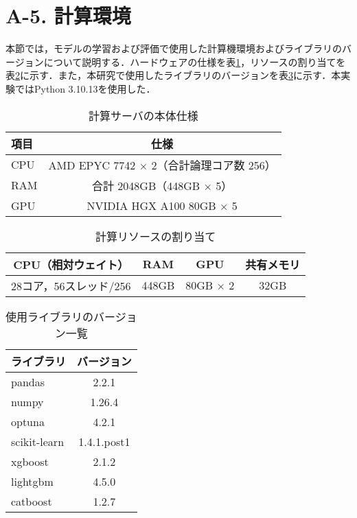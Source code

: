 \section*{A-5. 計算環境}
本節では，モデルの学習および評価で使用した計算機環境およびライブラリのバージョンについて説明する．ハードウェアの仕様を表\ref{tab:server_specs}，リソースの割り当てを表\ref{tab:resource_allocation}に示す．また，本研究で使用したライブラリのバージョンを表\ref{tab:versions}に示す．本実験ではPython 3.10.13を使用した．
\begin{table}[htbp]
    \centering
    \caption{計算サーバの本体仕様}
    \label{tab:server_specs}
    \begin{tabular}{l|c}
        \hline\hline\hline
        項目 & 仕様 \\
        \hline
        CPU  & AMD EPYC 7742 × 2（合計論理コア数 256） \\
        RAM  & 合計 2048GB（448GB × 5） \\
        GPU  & NVIDIA HGX A100 80GB × 5 \\
        \hline\hline\hline
    \end{tabular}
\end{table}

\begin{table}[htbp]
    \centering
    \caption{計算リソースの割り当て}
    \label{tab:resource_allocation}
    \begin{tabular}{c|c|c|c}
        \hline\hline\hline
        CPU（相対ウェイト） & RAM & GPU & 共有メモリ \\
        \hline
        28コア，56スレッド/256 & 448GB & 80GB × 2 & 32GB  \\
        \hline\hline\hline
    \end{tabular}
\end{table}

\begin{table}[htbp]
    \centering
    \caption{使用ライブラリのバージョン一覧}
    \label{tab:versions}
    \begin{tabular}{l|c}
        \hline\hline\hline
        ライブラリ & バージョン \\
        \hline
        pandas & 2.2.1 \\
        numpy & 1.26.4 \\
        optuna & 4.2.1 \\
        scikit-learn & 1.4.1.post1 \\
        xgboost & 2.1.2 \\
        lightgbm & 4.5.0 \\
        catboost & 1.2.7 \\
        \hline\hline\hline
    \end{tabular}
\end{table}

